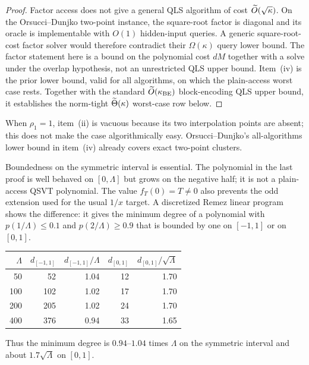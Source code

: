\begin{proof}
Factor access does not give a general QLS algorithm of cost
$\widetilde{O}(\sqrt\kappa)$.  On the Orsucci--Dunjko two-point instance, the
square-root factor is diagonal and its oracle is implementable with
$O(1)$ hidden-input queries.  A generic square-root-cost factor solver would
therefore contradict their $\Omega(\kappa)$ query lower bound.  The factor
statement here is a bound on the polynomial cost $dM$ together with a solve
under the overlap hypothesis, not an unrestricted QLS upper bound.
Item~\textup{(iv)} is the prior lower bound, valid for all algorithms, on
which the plain-access worst case rests.  Together with the standard
$\widetilde{O}(\kappa_{\rm BE})$ block-encoding QLS upper bound, it establishes
the norm-tight $\widetilde{\Theta}(\kappa)$ worst-case row below.
\end{proof}

When $\rho_1=1$, item~\textup{(ii)} is vacuous because its two interpolation
points are absent; this does not make the case algorithmically easy.
Orsucci--Dunjko's all-algorithms lower bound in item~\textup{(iv)} already
covers exact two-point clusters.

Boundedness on the symmetric interval is essential.  The polynomial in the
last proof is well behaved on $[0,\Lambda]$ but grows on the negative half;
it is not a plain-access QSVT polynomial.  The value $f_T(0)=T\ne0$ also
prevents the odd extension used for the usual $1/x$ target.  A discretized
Remez linear program shows the difference: it gives the minimum degree of a
polynomial with $p(1/\Lambda)\leq0.1$ and $p(2/\Lambda)\geq0.9$ that is
bounded by one on $[-1,1]$ or on $[0,1]$.
\begin{center}
\begin{tabular}{@{}rrrrr@{}}
\toprule
$\Lambda$ & $d_{[-1,1]}$ & $d_{[-1,1]}/\Lambda$
 & $d_{[0,1]}$ & $d_{[0,1]}/\sqrt\Lambda$ \\
\midrule
50  & 52  & 1.04 & 12 & 1.70 \\
100 & 102 & 1.02 & 17 & 1.70 \\
200 & 205 & 1.02 & 24 & 1.70 \\
400 & 376 & 0.94 & 33 & 1.65 \\
\bottomrule
\end{tabular}
\end{center}
Thus the minimum degree is $0.94$--$1.04$ times $\Lambda$ on the symmetric
interval and about $1.7\sqrt\Lambda$ on $[0,1]$.

